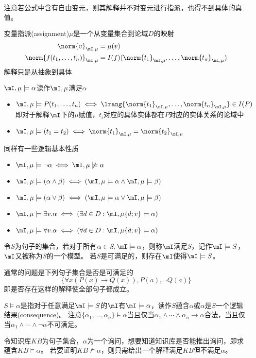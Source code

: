 注意若公式中含有自由变元，则其解释并不对变元进行指派，也得不到具体的真值。

\begin{definition}[赋值(denotation)]
变量指派(assignment)$\mu$是一个从变量集合到论域$D$的映射
\[\begin{aligned}
\norm{v}_{\mI,\mu}&=\mu(v)\\
\norm{f(t_1,\ldots,t_n)}_{\mI,\mu}&=I(f)(\norm{t_1}_{\mI,\mu},\ldots,\norm{t_n}_{\mI,\mu})
\end{aligned}\]
解释只是从抽象到具体
\end{definition}
\begin{definition}[满足]
$\mI,\mu\models\alpha$读作$\mI,\mu$满足$\alpha$
\begin{itemize}
	\item $\mI,\mu\models P(t_1,\ldots,t_n)\iff\lrang{\norm{t_1}_{\mI,\mu},\ldots,\norm{t_n}_{\mI,\mu}}\in I(P)$\\
	即对于解释$\mI$下的$\mu$赋值，$t_i$对应的具体实体都在$P$对应的实体关系的论域中
	\item $\mI,\mu\models(t_1=t_2)\iff\norm{t_1}_{\mI,\mu}=\norm{t_2}_{\mI,\mu}$
\end{itemize}
同样有一些逻辑基本性质
\begin{itemize}
	\item $\mI,\mu\models\lnot\alpha\iff\mI,\mu\not\models\alpha$
	\item $\mI,\mu\models(\alpha\land\beta)\iff(\mI,\mu\models\alpha\land\mI,\mu\models\beta)$
	\item $\mI,\mu\models(\alpha\lor\beta)\iff(\mI,\mu\models\alpha\lor\mI,\mu\models\beta)$
	\item $\mI,\mu\models\exists v.\alpha\iff(\exists d\in D:\mI,\mu\{d;v\}\models\alpha)$
	\item $\mI,\mu\models\forall v.\alpha\iff(\forall d\in D:\mI,\mu\{d;v\}\models\alpha)$
\end{itemize}

令$S$为句子的集合，若对于所有$\alpha\in S,\mI\models\alpha$，则称$\mI$满足$S$，记作$\mI\models S$，$\mI$又被称为$S$的一个模型。
若$S$是可满足的，则存在$\mI$使得$\mI\models S$。
\end{definition}
\begin{example}
通常的问题是下列句子集合是否是可满足的
\[\{\forall x(P(x)\to Q(x)),P(a),\lnot Q(a)\}\]
即是否存在这样的解释使全部句子都成立。
\end{example}

\begin{definition}[蕴含(entail)]
$S\models\alpha$是指对于任意满足$\mI\models S$的$\mI$有$\mI\models\alpha$，读作$S$蕴含$\alpha$或$\alpha$是$S$一个逻辑结果(consequence)。
注意$\{\alpha_1,\ldots,\alpha_n\}\models\alpha$当且仅当$\alpha_1\land\cdots\land\alpha_n\to\alpha$合法，当且仅当$\alpha_1\land\cdots\land\lnot\alpha$不可满足。
\end{definition}
\begin{example}
令知识库$KB$为句子集合，$\alpha$为一个询问，想要知道知识库是否能推出询问，即求蕴含$KB\models\alpha$。
若要证明$KB\not\models\alpha$，则只需给出一个解释满足$KB$但不满足$\alpha$。
\end{example}

